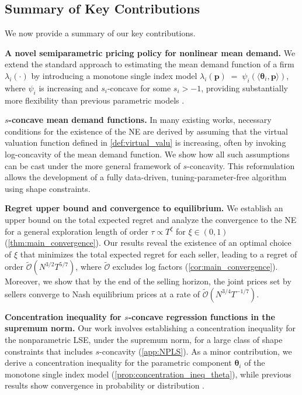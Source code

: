 \documentclass{article} %
\begin{document}
\subsection{Summary of Key Contributions}
We now provide a summary of our key contributions. 

{\bf A novel semiparametric pricing policy for nonlinear mean demand.} We extend the standard approach to estimating the mean demand function of a firm \(\lambda_i(\cdot)\) by introducing a monotone single index model
$\lambda_i(\mathbf{p}) \;=\; \psi_i(\langle\boldsymbol{\theta}_i,\mathbf{p}\rangle)$, where $\psi_i$ is increasing and $s_i$-concave for some $s_i>-1$, providing substantially more flexibility than previous parametric models \citep{li2024lego, kachani2007modeling, gallego2006price}.

{\bf $s$-concave mean demand functions.} 
In many existing works, necessary conditions for the existence of the NE are derived by assuming that the virtual valuation function defined in \cref{def:virtual_valu} is increasing, often by invoking log-concavity of the mean demand function. We show how all such assumptions can be cast under the more general framework of $s$-concavity. This reformulation allows the development of a fully data-driven, tuning-parameter-free algorithm using shape constraints.

{\bf Regret upper bound and convergence to equilibrium.} We establish an upper bound on the total expected regret and analyze the convergence to the NE for a general exploration length of order 
$\tau \propto T^{\xi}$ for $\xi \in (0,1)$ (\cref{thm:main_convergence}). Our results reveal the existence of an optimal choice of $\xi$ that minimizes the total expected regret for each seller, leading to a regret of order $\widetilde{\mathcal{O}}(N^{3/2}T^{5/7})$, where $\widetilde{\mathcal{O}}$ excludes log factors (\cref{cor:main_convergence}). Moreover, we show that by the end of the selling horizon, the joint prices set by sellers converge to Nash equilibrium prices at a rate of $\widetilde{\mathcal{O}}(N^{3/4}T^{-1/7})$.

{\bf Concentration inequality for $s$-concave regression functions in the supremum norm.} Our work involves establishing a concentration inequality for the nonparametric LSE, under the supremum norm, for a large class of shape constraints that includes $s$-concavity (\cref{app:NPLS}). As a minor contribution, we derive a concentration inequality for the parametric component $\boldsymbol{\theta}_i$ of the monotone single index model (\cref{prop:concentration_ineq_theta}), while previous results show convergence in probability or distribution \citep{balabdaoui2019least}.
\end{document}
